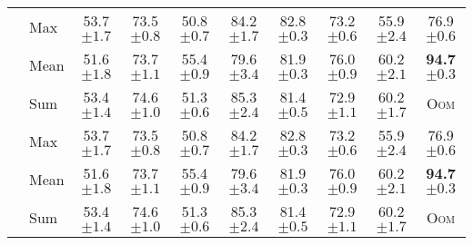 \begin{table}
{\begin{tabular}{@{}c <{\enspace}@{}lcccccccc@{}}
			\cmidrule{2-10}	
						
			\multirow{3}{*}{\rotatebox{90}{GCN}} & \textsf{Max}                     & 53.7   \scriptsize	$\pm 1.7$        & 73.5     \scriptsize $\pm 0.8$          & 50.8 \scriptsize $\pm 0.7$            & 84.2  \scriptsize $\pm 1.7$          & 82.8  \scriptsize $\pm 0.3$         & 73.2  \scriptsize $\pm 0.6$          & 55.9  \scriptsize $\pm 2.4$         & 76.9  \scriptsize $\pm 0.6$         
			\\ 
			                                                         & \textsf{Mean}    & 51.6 \scriptsize	$\pm 1.8$          & 73.7    \scriptsize $\pm 1.1$           & 55.4 \scriptsize $\pm 0.9$            & 79.6   \scriptsize $\pm 3.4$         & 81.9 \scriptsize $\pm 0.3 $         & 76.0  \scriptsize $\pm 0.9$          & 60.2 \scriptsize $\pm 2.1 $         & \textbf{94.7} \scriptsize $\pm 0.3$ 
			\\ 
			                                                         & \textsf{Sum}                  & 53.4 \scriptsize	$\pm 1.4$          & 74.6   \scriptsize $\pm 1.0$            & 51.3 \scriptsize $\pm 0.6$            & 85.3  \scriptsize $\pm 2.4$          & 81.4 \scriptsize $\pm 0.5$          & 72.9  \scriptsize$\pm 1.1$           & 60.2  \scriptsize $\pm 1.7$         & \textsc{Oom}                        
			\\
			
			\cmidrule{2-10}	
						
			\multirow{3}{*}{\rotatebox{90}{GIN}} & \textsf{Max}                     & 53.7   \scriptsize	$\pm 1.7$        & 73.5     \scriptsize $\pm 0.8$          & 50.8 \scriptsize $\pm 0.7$            & 84.2  \scriptsize $\pm 1.7$          & 82.8  \scriptsize $\pm 0.3$         & 73.2  \scriptsize $\pm 0.6$          & 55.9  \scriptsize $\pm 2.4$         & 76.9  \scriptsize $\pm 0.6$         
			\\ 
			                                                         & \textsf{Mean}           & 51.6 \scriptsize	$\pm 1.8$          & 73.7    \scriptsize $\pm 1.1$           & 55.4 \scriptsize $\pm 0.9$            & 79.6   \scriptsize $\pm 3.4$         & 81.9 \scriptsize $\pm 0.3 $         & 76.0  \scriptsize $\pm 0.9$          & 60.2 \scriptsize $\pm 2.1 $         & \textbf{94.7} \scriptsize $\pm 0.3$ 
			\\ 
			                                                         & \textsf{Sum}                    & 53.4 \scriptsize	$\pm 1.4$          & 74.6   \scriptsize $\pm 1.0$            & 51.3 \scriptsize $\pm 0.6$            & 85.3  \scriptsize $\pm 2.4$          & 81.4 \scriptsize $\pm 0.5$          & 72.9  \scriptsize$\pm 1.1$           & 60.2  \scriptsize $\pm 1.7$         & \textsc{Oom}                        
			\\


\end{tabular}}
\end{table}

